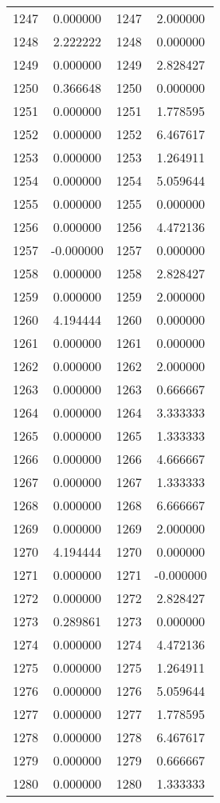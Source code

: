 \documentclass[12pt]{article}
\begin{document}
\begin{longtable}{@{}cccc@{}}
1247 & 0.000000 & 1247 & 2.000000 \\
1248 & 2.222222 & 1248 & 0.000000 \\
1249 & 0.000000 & 1249 & 2.828427 \\
1250 & 0.366648 & 1250 & 0.000000 \\
1251 & 0.000000 & 1251 & 1.778595 \\
1252 & 0.000000 & 1252 & 6.467617 \\
1253 & 0.000000 & 1253 & 1.264911 \\
1254 & 0.000000 & 1254 & 5.059644 \\
1255 & 0.000000 & 1255 & 0.000000 \\
1256 & 0.000000 & 1256 & 4.472136 \\
1257 & -0.000000 & 1257 & 0.000000 \\
1258 & 0.000000 & 1258 & 2.828427 \\
1259 & 0.000000 & 1259 & 2.000000 \\
1260 & 4.194444 & 1260 & 0.000000 \\
1261 & 0.000000 & 1261 & 0.000000 \\
1262 & 0.000000 & 1262 & 2.000000 \\
1263 & 0.000000 & 1263 & 0.666667 \\
1264 & 0.000000 & 1264 & 3.333333 \\
1265 & 0.000000 & 1265 & 1.333333 \\
1266 & 0.000000 & 1266 & 4.666667 \\
1267 & 0.000000 & 1267 & 1.333333 \\
1268 & 0.000000 & 1268 & 6.666667 \\
1269 & 0.000000 & 1269 & 2.000000 \\
1270 & 4.194444 & 1270 & 0.000000 \\
1271 & 0.000000 & 1271 & -0.000000 \\
1272 & 0.000000 & 1272 & 2.828427 \\
1273 & 0.289861 & 1273 & 0.000000 \\
1274 & 0.000000 & 1274 & 4.472136 \\
1275 & 0.000000 & 1275 & 1.264911 \\
1276 & 0.000000 & 1276 & 5.059644 \\
1277 & 0.000000 & 1277 & 1.778595 \\
1278 & 0.000000 & 1278 & 6.467617 \\
1279 & 0.000000 & 1279 & 0.666667 \\
1280 & 0.000000 & 1280 & 1.333333 \\

\end{longtable}
\end{document}
